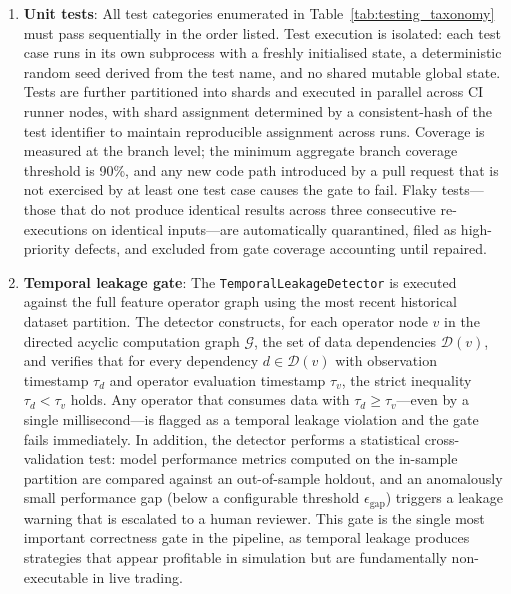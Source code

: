 \documentclass[12pt,openany]{book}
\numberwithin{equation}{chapter}
\theoremstyle{plain}
\theoremstyle{definition}
\theoremstyle{remark}
\begin{document}
\begin{enumerate}
    \item \textbf{Unit tests}: All test categories enumerated in
          Table~\ref{tab:testing_taxonomy} must pass sequentially in the order listed.
          Test execution is isolated: each test case runs in its own subprocess with a
          freshly initialised state, a deterministic random seed derived from the test
          name, and no shared mutable global state. Tests are further partitioned into
          shards and executed in parallel across CI runner nodes, with shard assignment
          determined by a consistent-hash of the test identifier to maintain
          reproducible assignment across runs. Coverage is measured at the branch level;
          the minimum aggregate branch coverage threshold is 90\%, and any new code
          path introduced by a pull request that is not exercised by at least one test
          case causes the gate to fail. Flaky tests—those that do not produce identical
          results across three consecutive re-executions on identical inputs—are
          automatically quarantined, filed as high-priority defects, and excluded from
          gate coverage accounting until repaired.

    \item \textbf{Temporal leakage gate}: The \texttt{TemporalLeakageDetector} is
          executed against the full feature operator graph using the most recent
          historical dataset partition. The detector constructs, for each operator
          node $v$ in the directed acyclic computation graph $\mathcal{G}$, the set of
          data dependencies $\mathcal{D}(v)$, and verifies that for every dependency
          $d \in \mathcal{D}(v)$ with observation timestamp $\tau_d$ and operator
          evaluation timestamp $\tau_v$, the strict inequality $\tau_d < \tau_v$ holds.
          Any operator that consumes data with $\tau_d \geq \tau_v$—even by a single
          millisecond—is flagged as a temporal leakage violation and the gate fails
          immediately. In addition, the detector performs a statistical cross-validation
          test: model performance metrics computed on the in-sample partition are
          compared against an out-of-sample holdout, and an anomalously small
          performance gap (below a configurable threshold $\epsilon_{\text{gap}}$)
          triggers a leakage warning that is escalated to a human reviewer. This gate
          is the single most important correctness gate in the pipeline, as temporal
          leakage produces strategies that appear profitable in simulation but are
          fundamentally non-executable in live trading.


\end{enumerate}
\end{document}
